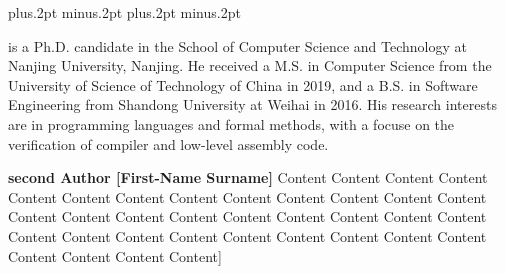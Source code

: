 \documentclass[twoside]{article}
\begin{document}
\begin{multicols}{2}

  \balance
  
  
  
  
  
  

  {
    \footnotesize
    \itemsep=-3pt plus.2pt minus.2pt
    \baselineskip=13pt plus.2pt minus.2pt
    }

    \vspace{5mm}

\noindent\parbox{8.3cm}
  {
  {\small{}  
  is a Ph.D. candidate in the School of Computer Science 
  and Technology at Nanjing University, Nanjing. 
  He received a M.S. in Computer Science from 
  the University of Science of Technology of China
  in 2019, 
  and a B.S. in Software Engineering from Shandong 
  University at Weihai in 2016. His research interests
  are in programming languages and formal methods, 
  with a focuse on the verification of compiler 
  and low-level assembly code.}\\[1mm]}

\noindent\parbox{8.3cm}
{
{\small\quad 
  {\bf second Author [First-Name Surname]}  
  Content Content Content 
  Content Content Content 
  Content Content Content 
  Content Content Content 
  Content Content Content 
  Content Content Content 
  Content Content Content 
  Content Content Content 
  Content Content Content 
  Content Content Content 
  Content Content Content Content Content] }\\[1mm]}


\end{multicols}
\end{document}
